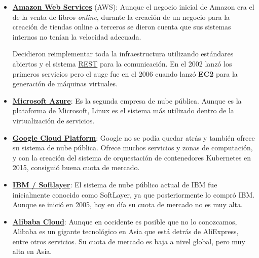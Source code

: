 \begin{itemize}
	\item \textbf{\href{https://aws.amazon.com/es/}{Amazon Web Services}} (AWS): Aunque el negocio inicial de Amazon era el de la venta de libros \textit{online}, durante la creación de un negocio para la creación de tiendas online a terceros se dieron cuenta que sus sistemas internos no tenían la velocidad adecuada.
	
	Decidieron reimplementar toda la infraestructura utilizando estándares abiertos y el sistema \href{https://en.wikipedia.org/wiki/REST}{REST} para la comunicación. En el 2002 lanzó los primeros servicios pero el auge fue en el 2006 cuando lanzó \textbf{EC2} para la generación de máquinas virtuales.
	
	\item \textbf{\href{https://azure.microsoft.com/es-es/}{Microsoft Azure}}: Es la segunda empresa de nube pública. Aunque es la plataforma de Microsoft, Linux es el sistema más utilizado dentro de la virtualización de servicios.
	
	\item \textbf{\href{https://cloud.google.com/}{Google Cloud Platform}}: Google no se podía quedar atrás y también ofrece su sistema de nube pública. Ofrece muchos servicios y zonas de computación, y con la creación del sistema de orquestación de contenedores Kubernetes en 2015, consiguió buena cuota de mercado.
	
	\item \textbf{\href{https://www.ibm.com/cloud}{IBM / Softlayer}}: El sistema de nube público actual de IBM fue inicialmente conocido como SoftLayer, ya que posteriormente lo compró IBM. Aunque se inició en 2005, hoy en día su cuota de mercado no es muy alta.
	
	\item \textbf{\href{https://www.alibabacloud.com/}{Alibaba Cloud}}: Aunque en occidente es posible que no lo conozcamos, Alibaba es un gigante tecnológico en Asia que está detrás de AliExpress, entre otros servicios.  Su cuota de mercado es baja a nivel global, pero muy alta en Asia.
	
\end{itemize}
